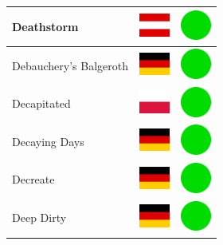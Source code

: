 \documentclass[12pt, a4paper, twoside]{report}
\begin{document}
\begin{center}
\begin{longtable}{|p{5cm}|p{2cm}|p{2cm}|}
 Deathstorm                                                 & \includegraphics[width=1cm]{../4x3/at} &   \includegraphics[width=1cm]{../likes/y} \\ \hline
 Debauchery's Balgeroth                                     & \includegraphics[width=1cm]{../4x3/de} &   \includegraphics[width=1cm]{../likes/y} \\ \hline
 Decapitated                                                & \includegraphics[width=1cm]{../4x3/pl} &   \includegraphics[width=1cm]{../likes/y} \\ \hline
 Decaying Days                                              & \includegraphics[width=1cm]{../4x3/de} &   \includegraphics[width=1cm]{../likes/y} \\ \hline
 Decreate                                                   & \includegraphics[width=1cm]{../4x3/de} &   \includegraphics[width=1cm]{../likes/y} \\ \hline
 Deep Dirty                                                 & \includegraphics[width=1cm]{../4x3/de} &   \includegraphics[width=1cm]{../likes/y} \\ \hline

\end{longtable}
\end{center}
\end{document}
